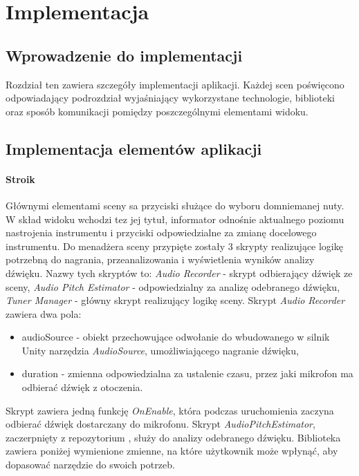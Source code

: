 \chapter{Implementacja}

\section{Wprowadzenie do implementacji}


Rozdział ten zawiera szczegóły implementacji aplikacji. Każdej scen poświęcono odpowiadający podrozdział wyjaśniający wykorzystane technologie, biblioteki oraz sposób komunikacji pomiędzy poszczególnymi elementami widoku. 

\section{Implementacja elementów aplikacji}

\subsubsection{Stroik}

Głównymi elementami sceny sa przyciski służące do wyboru domniemanej nuty. W skład widoku wchodzi tez jej tytuł, informator odnośnie aktualnego poziomu nastrojenia instrumentu i przyciski odpowiedzialne za zmianę docelowego instrumentu. Do menadżera sceny przypięte zostały 3 skrypty realizujące logikę potrzebną do nagrania, przeanalizowania i wyświetlenia wyników analizy dźwięku. Nazwy tych skryptów to: \emph{Audio Recorder} - skrypt odbierający dźwięk ze sceny, \emph{Audio Pitch Estimator} - odpowiedzialny za analizę odebranego dźwięku, \emph{Tuner Manager} - główny skrypt realizujący logikę sceny. Skrypt \emph{Audio Recorder} zawiera dwa pola:

\begin{itemize}
    \item audioSource - obiekt przechowujące odwołanie do wbudowanego w silnik Unity narzędzia \emph{AudioSource}, umożliwiającego nagranie dźwięku,
    \item duration - zmienna odpowiedzialna za ustalenie czasu, przez jaki mikrofon ma odbierać dźwięk z otoczenia.
\end{itemize}

Skrypt zawiera jedną funkcję \emph{OnEnable}, która podczas uruchomienia zaczyna odbierać dźwięk dostarczany do mikrofonu. Skrypt \emph{AudioPitchEstimator}, zaczerpnięty z repozytorium \cite{https://github.com/nakakq/AudioPitchEstimatorForUnity}, służy do analizy odebranego dźwięku. Biblioteka zawiera poniżej wymienione zmienne, na które użytkownik może wpłynąć, aby dopasować narzędzie do swoich potrzeb.

